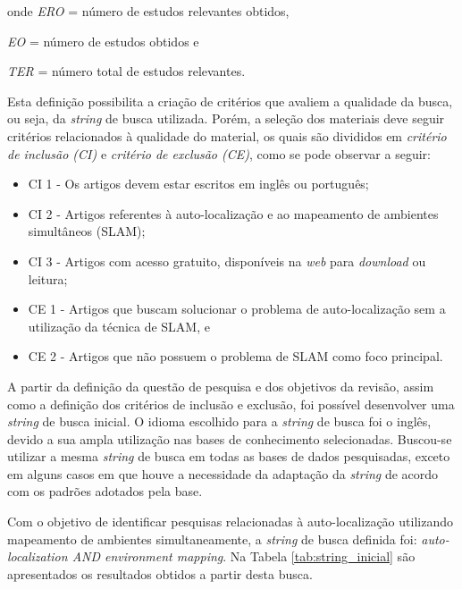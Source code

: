 		onde \textit{ERO} = número de estudos relevantes obtidos,
		
		\textit{EO} = número de estudos obtidos e

		\textit{TER} = número total de estudos relevantes.

		Esta definição possibilita a criação de critérios que avaliem a qualidade da busca, ou seja, da \textit{string} de busca utilizada. Porém, a seleção dos materiais deve seguir critérios relacionados à qualidade do material, os quais são divididos em \textit{critério de inclusão (CI)} e \textit{critério de exclusão (CE)}, como se pode observar a seguir:

		\begin{itemize}
			\item CI 1 - Os artigos devem estar escritos em inglês ou português;
			\item CI 2 - Artigos referentes à auto-localização e ao mapeamento de ambientes simultâneos (SLAM);
			\item CI 3 - Artigos com acesso gratuito, disponíveis na \textit{web} para \textit{download} ou leitura;
			\item CE 1 - Artigos que buscam solucionar o problema de auto-localização sem a utilização da técnica de SLAM, e
			\item CE 2 - Artigos que não possuem o problema de SLAM como foco principal.
		\end{itemize}

		A partir da definição da questão de pesquisa e dos objetivos da revisão, assim como a definição dos critérios de inclusão e exclusão, foi possível desenvolver uma \textit{string} de busca inicial. O idioma escolhido para a \textit{string} de busca foi o inglês, devido a sua ampla utilização nas bases de conhecimento selecionadas. Buscou-se utilizar a mesma \textit{string} de busca em todas as bases de dados pesquisadas, exceto em alguns casos em que houve a necessidade da adaptação da \textit{string} de acordo com os padrões adotados pela base.


			Com o objetivo de identificar pesquisas relacionadas à auto-localização utilizando mapeamento de ambientes simultaneamente, a \textit{string} de busca definida foi: \textit{auto-localization AND environment mapping}. Na Tabela \ref{tab:string_inicial} são apresentados os resultados obtidos a partir desta busca.


